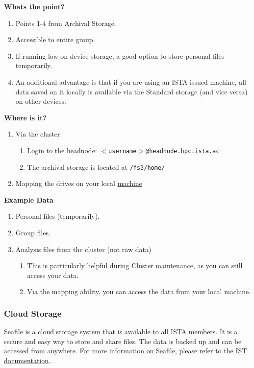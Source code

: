 \documentclass{article}
\begin{document}
\noindent
\textbf{Whats the point?}
\newline
\begin{enumerate}
    \item Points 1-4 from Archival Storage.
    \item Accessible to entire group.
    \item If running low on device storage, a good option to store personal files temporarily. 
    \item An additional advantage is that if you are using an ISTA issued machine, all data saved on it locally is available via the Standard storage (and vice versa) on other devices.
\end{enumerate}

\noindent
\textbf{Where is it?}
\newline
\begin{enumerate}
    \item Via the cluster: 
    \begin{enumerate}
        \item Login to the headnode: \texttt{$<$username$>$@headnode.hpc.ista.ac}
        \item The archival storage is located at \texttt{/fs3/home/}
    \end{enumerate}
    \item Mapping the drives on your local \href{https://it.pages.ist.ac.at/docs/it-documentation/fileservers/fileshare/}{machine}
\end{enumerate}

\noindent
\textbf{Example Data}
\begin{enumerate}
    \item Personal files (temporarily).
    \item Group files.
    \item Analysis files from the cluster (not raw data)
    \begin{enumerate}
        \item This is particularly helpful during Cluster maintenance, as you can still access your data.
        \item Via the mapping ability, you can access the data from your local machine.
    \end{enumerate}

\end{enumerate}

\subsubsection{Cloud Storage}
Seafile is a cloud storage system that is available to all ISTA members. It is a secure and easy way to store and share files. The data is backed up and can be accessed from anywhere. For more information on Seafile, please refer to the \href{https://it.pages.ist.ac.at/how-to-safely-share-data/}{IST documentation}.
\end{document}
